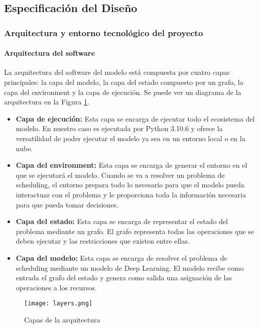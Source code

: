 \subsection{Especificación del Diseño}
\subsubsection{Arquitectura y entorno tecnológico del proyecto}
\paragraph{Arquitectura del software}
La arquitectura del software del modelo está compuesta por cuatro capas principales: 
la capa del modelo, la capa del estado compuesto por un grafo, la capa del 
environment y la capa de ejecución. Se puede ver un diagrama de la arquitectura en la
Figura \ref{fig:layers}.

\begin{itemize}
    \item \textbf{Capa de ejecución:} Esta capa se encarga de ejecutar todo el ecosistema
    del modelo. En nuestro caso es ejecutada por Python 3.10.6\cite{C8d} y ofrece la versatilidad de
    poder ejecutar el modelo ya sea en un entorno local o en la nube. 
    \item \textbf{Capa del environment:} Esta capa se encarga de generar el entorno en el que se
    ejecutará el modelo. Cuando se va a resolver un problema de scheduling, el entorno
    prepara todo lo necesario para que el modelo pueda interactuar con el problema y le
    proporciona toda la información necesaria para que pueda tomar decisiones.
    \item \textbf{Capa del estado:} Esta capa se encarga de representar el estado del problema
    mediante un grafo. El grafo representa todas las operaciones que se deben ejecutar y
    las restricciones que existen entre ellas.
    \item \textbf{Capa del modelo:} Esta capa se encarga de resolver el problema de scheduling
    mediante un modelo de Deep Learning. El modelo recibe como entrada el grafo del
    estado y genera como salida una asignación de las operaciones a los recursos. 
\end{itemize}

\begin{figure}[ht]
    \centering
    \texttt{[image: layers.png]}
    \caption{Capas de la arquitectura}
    \label{fig:layers}
\end{figure}


